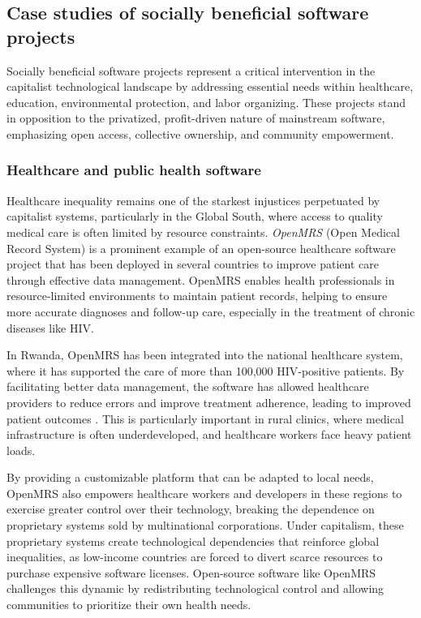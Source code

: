 \begin{refsection}
\subsection{Case studies of socially beneficial software projects}

Socially beneficial software projects represent a critical intervention in the capitalist technological landscape by addressing essential needs within healthcare, education, environmental protection, and labor organizing. These projects stand in opposition to the privatized, profit-driven nature of mainstream software, emphasizing open access, collective ownership, and community empowerment.

\subsubsection{Healthcare and public health software}

Healthcare inequality remains one of the starkest injustices perpetuated by capitalist systems, particularly in the Global South, where access to quality medical care is often limited by resource constraints. \textit{OpenMRS} (Open Medical Record System) is a prominent example of an open-source healthcare software project that has been deployed in several countries to improve patient care through effective data management. OpenMRS enables health professionals in resource-limited environments to maintain patient records, helping to ensure more accurate diagnoses and follow-up care, especially in the treatment of chronic diseases like HIV.

In Rwanda, OpenMRS has been integrated into the national healthcare system, where it has supported the care of more than 100,000 HIV-positive patients. By facilitating better data management, the software has allowed healthcare providers to reduce errors and improve treatment adherence, leading to improved patient outcomes \cite[pp.~146-148]{farmer2010}. This is particularly important in rural clinics, where medical infrastructure is often underdeveloped, and healthcare workers face heavy patient loads. 

By providing a customizable platform that can be adapted to local needs, OpenMRS also empowers healthcare workers and developers in these regions to exercise greater control over their technology, breaking the dependence on proprietary systems sold by multinational corporations. Under capitalism, these proprietary systems create technological dependencies that reinforce global inequalities, as low-income countries are forced to divert scarce resources to purchase expensive software licenses. Open-source software like OpenMRS challenges this dynamic by redistributing technological control and allowing communities to prioritize their own health needs.


\end{refsection}
